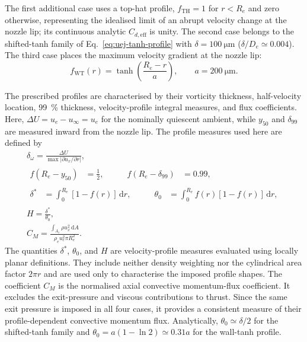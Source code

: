 The first additional case uses a top-hat profile, \(f_{\mathrm{TH}}=1\) for
\(r<R_e\) and zero otherwise, representing the idealised limit of an abrupt
velocity change at the nozzle lip; its continuous analytic
\(C_{d,\mathrm{eff}}\) is unity. The second case belongs to the shifted-tanh
family of Eq.~\eqref{eq:uej-tanh-profile} with
\(\delta=\SI{100}{\micro\meter}\) (\(\delta/D_e\simeq0.004\)). The third
case places the maximum velocity gradient at the nozzle lip:
\begin{equation}
    f_{\mathrm{WT}}(r)
    =\tanh\left(\frac{R_e-r}{a}\right),
    \qquad a=\SI{200}{\micro\meter}.
    \label{eq:uej-wall-tanh-profile}
\end{equation}

The prescribed profiles are characterised by their vorticity thickness,
half-velocity location, \SI{99}{\percent} thickness, velocity-profile
integral measures, and flux coefficients. Here,
\(\Delta U=u_e-u_\infty=u_e\) for the nominally quiescent ambient, while
\(y_{50}\) and \(\delta_{99}\) are measured inward from the nozzle lip.
The profile measures used here are defined by
\begin{subequations}
\label{eq:uej-profile-measures}
\begin{gather}
    \delta_\omega
    =\frac{\Delta U}{\max\lvert\partial u_x/\partial r\rvert},
    \\[0.25em]
    \begin{aligned}
    f(R_e-y_{50})&=\frac{1}{2},
    &\qquad
    f(R_e-\delta_{99})&=0.99,
    \end{aligned}
    \\[0.25em]
    \begin{aligned}
    \delta^*
    &=\int_0^{R_e}\left[1-f(r)\right]\,\mathrm{d}r,
    &\qquad
    \theta_0
    &=\int_0^{R_e}f(r)\left[1-f(r)\right]\,\mathrm{d}r,
    \end{aligned}
    \\[0.25em]
    H=\frac{\delta^*}{\theta_0},
    \\[0.25em]
    C_M=\frac{\displaystyle\int_{A_e}\rho u_x^2\,\mathrm{d}A}
             {\rho_e u_e^2\pi R_e^2}.
\end{gather}
\end{subequations}
The quantities \(\delta^*\), \(\theta_0\), and \(H\) are
velocity-profile measures evaluated using locally planar definitions. They
include neither density weighting nor the cylindrical area factor \(2\pi r\)
and are used only to characterise the imposed profile shapes. The coefficient
\(C_M\) is the normalised axial convective momentum-flux coefficient. It
excludes the exit-pressure and viscous contributions to thrust. Since the
same exit pressure is imposed in all four cases, it provides a consistent
measure of their profile-dependent convective momentum flux. Analytically,
\(\theta_0\simeq\delta/2\) for the shifted-tanh family and
\(\theta_0=a(1-\ln 2)\simeq0.31a\) for the wall-tanh profile.

